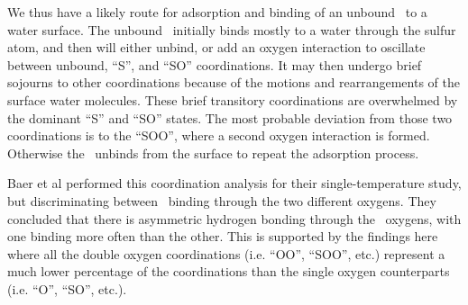 We thus have a likely route for adsorption and binding of an unbound \suldiox~to a water surface. The unbound \suldiox~initially binds mostly to a water through the sulfur atom, and then will either unbind, or add an oxygen interaction to oscillate between unbound, ``S'', and ``SO'' coordinations. It may then undergo brief sojourns to other coordinations because of the motions and rearrangements of the surface water molecules. These brief transitory coordinations are overwhelmed by the dominant ``S'' and ``SO'' states. The most probable deviation from those two coordinations is to the ``SOO'', where a second oxygen interaction is formed. Otherwise the \suldiox~unbinds from the surface to repeat the adsorption process.

Baer et al performed this coordination analysis for their single-temperature study, but discriminating between \suldiox~binding through the two different oxygens. They concluded that there is asymmetric hydrogen bonding through the \suldiox~oxygens, with one binding more often than the other. This is supported by the findings here where all the double oxygen coordinations (i.e. ``OO'', ``SOO'', etc.) represent a much lower percentage of the coordinations than the single oxygen counterparts (i.e. ``O'', ``SO'', etc.). 



